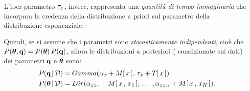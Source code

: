 \begin{nota}
L'iper-parametro $\tau_{\mathnormal{x}}$, invece, rappresenta una \emph{quantità di tempo immaginaria} che incorpora la credenza della distribuzione a priori sul parametro della distribuzione esponenziale.
\end{nota}
Quindi, se si assume che i parametri sono \emph{stocasticamente indipendenti}, cioè che $P(\boldsymbol{\textbf{\text{$\theta$}}},\boldsymbol{\textbf{\text{q}}})=P(\boldsymbol{\textbf{\text{$\theta$}}})\,P(\boldsymbol{\textbf{\text{q}}})$, allora le distribuzioni a posteriori (\ie{} condizionate sui dati) dei parametri $\boldsymbol{\textbf{\text{q}}}$ e $\boldsymbol{\textbf{\text{$\theta$}}}$ sono:
\begin{equation}\label{eq:ctbn-bayesian-params-posteriors}
\begin{aligned}
P(\param{q}\,\arrowvert\,\conceptsym{D})&=Gamma(\alpha_{\setel{x}}+\mstat{x},\,\tau_{\setel{x}}+\tstat{x}) \\
P(\param{$\theta$}\,\arrowvert\,\conceptsym{D})&=Dir(\alpha_{\setel{x}\setel{x}_1}+\mstat[x]{\setel{x}_1},\,\dotsc\,,\alpha_{\setel{x}\setel{x}_K}+\mstat[x]{\setel{x}_K})\text{.}
\end{aligned}
\end{equation}

